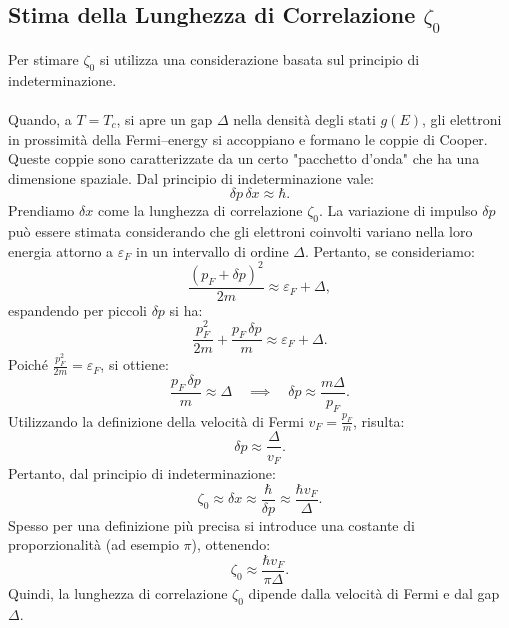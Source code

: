 \subsection{Stima della Lunghezza di Correlazione \(\zeta_0\)}
Per stimare \(\zeta_0\) si utilizza una considerazione basata sul principio di indeterminazione.\\\\
Quando, a \(T = T_c\), si apre un gap \(\Delta\) nella densità degli stati \(g(E)\), gli elettroni in prossimità della Fermi–energy si accoppiano e formano le coppie di Cooper. Queste coppie sono caratterizzate da un certo "pacchetto d'onda" che ha una dimensione spaziale. Dal principio di indeterminazione vale:
\[
\delta p\, \delta x \approx \hbar.
\]
Prendiamo \(\delta x\) come la lunghezza di correlazione \(\zeta_0\). La variazione di impulso \(\delta p\) può essere stimata considerando che gli elettroni coinvolti variano nella loro energia attorno a \(\varepsilon_F\) in un intervallo di ordine \(\Delta\). Pertanto, se consideriamo:
\[
\frac{(p_F+\delta p)^2}{2m} \approx \varepsilon_F + \Delta,
\]
espandendo per piccoli \(\delta p\) si ha:
\[
\frac{p_F^2}{2m} + \frac{p_F\,\delta p}{m} \approx \varepsilon_F + \Delta.
\]
Poiché \(\frac{p_F^2}{2m} = \varepsilon_F\), si ottiene:
\[
\frac{p_F\,\delta p}{m} \approx \Delta \quad \implies \quad \delta p \approx \frac{m\Delta}{p_F}.
\]
Utilizzando la definizione della velocità di Fermi \(v_F = \frac{p_F}{m}\), risulta:
\[
\delta p \approx \frac{\Delta}{v_F}.
\]
Pertanto, dal principio di indeterminazione:
\[
\zeta_0 \approx \delta x \approx \frac{\hbar}{\delta p} \approx \frac{\hbar v_F}{\Delta}.
\]
Spesso per una definizione più precisa si introduce una costante di proporzionalità (ad esempio \(\pi\)), ottenendo:
\[
\zeta_0 \approx \frac{\hbar v_F}{\pi \Delta}.
\]
Quindi, la lunghezza di correlazione \(\zeta_0\) dipende dalla velocità di Fermi e dal gap \(\Delta\).

